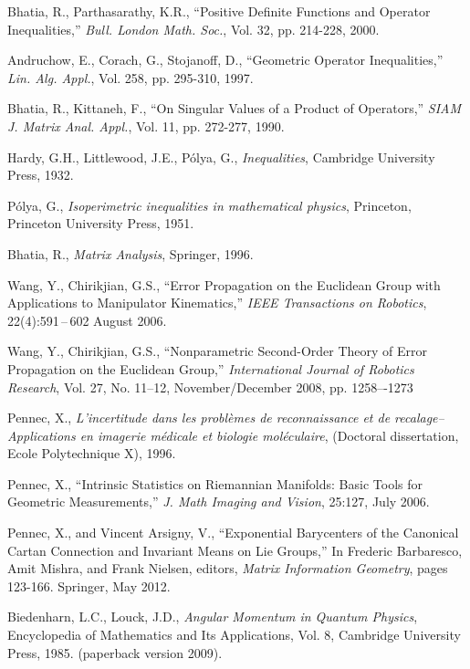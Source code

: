 \documentclass{svmult}
\begin{document}
\begin{thebibliography}{99}
Bhatia, R., Parthasarathy, K.R., ``Positive Definite Functions and Operator Inequalities,'' {\it Bull. London Math. Soc.},
Vol. 32, pp. 214-228, 2000.

Andruchow, E., Corach, G., Stojanoff, D., ``Geometric Operator Inequalities,'' {\it Lin. Alg. Appl.}, Vol. 258, pp. 295-310, 1997.


Bhatia, R., Kittaneh, F., ``On Singular Values of a Product of Operators,'' {\it SIAM J. Matrix Anal. Appl.}, Vol. 11, pp. 272-277, 1990.

Hardy, G.H., Littlewood, J.E., P\'{o}lya, G., 
{\it Inequalities}, Cambridge University Press, 1932.

P\'{o}lya, G.,
{\it Isoperimetric inequalities in mathematical physics},	
Princeton, Princeton University Press, 1951.

Bhatia, R., {\it Matrix Analysis}, Springer, 1996.

Wang, Y., Chirikjian, G.S., ``Error Propagation on the Euclidean Group with Applications
to Manipulator Kinematics,'' {\it IEEE Transactions on Robotics}, 22(4):591\,--\,602 August 2006.

Wang, Y., Chirikjian, G.S., ``Nonparametric Second-Order Theory
of Error Propagation on the Euclidean Group,'' {\it International Journal of Robotics Research}, Vol. 27, No. 11–12, November/December 2008, pp. 1258–-1273


Pennec, X., {\it L'incertitude dans les probl\`{e}mes de reconnaissance et de recalage--Applications en imagerie m\'{e}dicale et biologie mol\'{e}culaire}, (Doctoral dissertation, Ecole Polytechnique X),  1996. 

Pennec, X., ``Intrinsic Statistics on Riemannian Manifolds: Basic Tools for Geometric Measurements,'' {\it J. Math Imaging and Vision}, 25:127, July 2006.

Pennec, X., and Vincent Arsigny, V.,
``Exponential Barycenters of the Canonical Cartan Connection and Invariant Means on Lie Groups,'' In Frederic Barbaresco, Amit Mishra, and Frank Nielsen, editors, {\it Matrix Information Geometry}, pages 123-166. Springer, May 2012.

Biedenharn, L.C., Louck, J.D., {\it Angular Momentum in Quantum Physics},
Encyclopedia of Mathematics and Its Applications, Vol. 8, Cambridge University Press, 1985.
(paperback version 2009).


\end{thebibliography}
\end{document}
